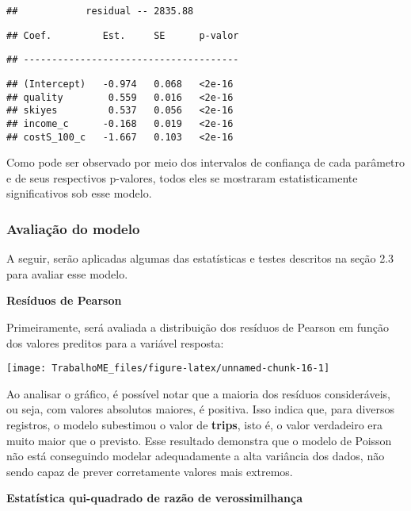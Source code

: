 \documentclass[
  twocolumn]{article}
\begin{document}
\begin{verbatim}
##            residual -- 2835.88
\end{verbatim}

\begin{verbatim}
## Coef.         Est.     SE      p-valor
\end{verbatim}

\begin{verbatim}
## --------------------------------------
\end{verbatim}

\begin{verbatim}
## (Intercept)   -0.974   0.068   <2e-16
## quality        0.559   0.016   <2e-16
## skiyes         0.537   0.056   <2e-16
## income_c      -0.168   0.019   <2e-16
## costS_100_c   -1.667   0.103   <2e-16
\end{verbatim}

Como pode ser observado por meio dos intervalos de confiança de cada
parâmetro e de seus respectivos p-valores, todos eles se mostraram
estatisticamente significativos sob esse modelo.

\subsubsection{Avaliação do modelo}\label{avaliauxe7uxe3o-do-modelo}

A seguir, serão aplicadas algumas das estatísticas e testes descritos na
seção 2.3 para avaliar esse modelo.

\textbf{Resíduos de Pearson}

Primeiramente, será avaliada a distribuição dos resíduos de Pearson em
função dos valores preditos para a variável resposta:

\begin{center}\texttt{[image: TrabalhoME\_files/figure-latex/unnamed-chunk-16-1]} \end{center}

Ao analisar o gráfico, é possível notar que a maioria dos resíduos
consideráveis, ou seja, com valores absolutos maiores, é positiva. Isso
indica que, para diversos registros, o modelo subestimou o valor de
\textbf{trips}, isto é, o valor verdadeiro era muito maior que o
previsto. Esse resultado demonstra que o modelo de Poisson não está
conseguindo modelar adequadamente a alta variância dos dados, não sendo
capaz de prever corretamente valores mais extremos.

\textbf{Estatística qui-quadrado de razão de verossimilhança}
\end{document}
